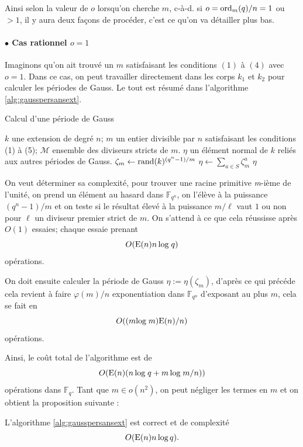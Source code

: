 \documentclass[a4paper]{article} %
\numberwithin{section}{part}
\numberwithin{equation}{section}
\newcommand\nroot[1]{\textit{#1}-ième}
\newcommand\GF[1]{\mathbb{F}_{#1}}
\newcommand\E[1]{\textup{E}(#1)}
\newcommand\ord[2]{\textup{ord}_{#1}(#2)}
\begin{document}
\vspace{0.3cm}
Ainsi selon la valeur de $o$ lorsqu'on cherche $m$, c-à-d. si $o = 
\ord{m}{q} /n = 1$ ou $> 1$, il y aura deux façons de procéder, c'est ce qu'on 
va détailler plus bas.
\paragraph{$\bullet$ Cas rationnel $o = 1$}
Imaginons qu'on ait trouvé un $m$ satisfaisant les conditions $(1)$ à $(4)$ avec
$o = 1$. Dans ce cas, on peut travailler directement dans les corps $k_1$ et 
$k_2$ pour calculer les périodes de Gauss. Le tout est résumé dans l'algorithme 
\ref{alg:gausspersansext}.

\begin{algorithm}
\caption{Calcul d'une période de Gauss}
\label{alg:gausspersansext}
\begin{algorithmic}[1]
\REQUIRE $k$ une extension de degré $n$; $m$ un entier divisible par $n$
satisfaisant les conditions (1) à (5); $\mathcal{M}$ ensemble des diviseurs
stricts de $m$.
\ENSURE $\eta$ un élément normal de $k$ reliés aux autres périodes de Gauss.
\bigskip
\REPEAT
    \STATE $\zeta_m \leftarrow \textup{rand}(k)^{(q^n - 1)/m}$
\STATE $\eta \leftarrow \sum_{a\in S}{\zeta_m^a}$
\RETURN $\eta$
\end{algorithmic}
\end{algorithm}
On veut déterminer sa complexité, pour trouver une racine primitive 
\nroot{m} de l'unité, on prend un élément au hasard dans $\GF{q^n}$, on l'élève 
à la puissance $(q^n - 1)/m$ et on teste si le résultat élevé à la puissance 
$m/\ell$ vaut $1$ ou non pour $\ell$ un diviseur premier strict de $m$. On 
s'attend à ce que cela réussisse après $O(1)$ essaies; chaque essaie prenant 
\begin{equation}
O(\E{n}n\,\textup{log\;}q)
\end{equation}
opérations.\par
On doit ensuite calculer la période de Gauss $\eta := \eta(\zeta_m)$,
d'après ce qui précéde cela revient à faire $\varphi(m)/n$ exponentiation dans
$\GF{q^n}$ d'exposant au plus $m$, cela se fait en 
\begin{equation}
O((m\textup{log\;}m)\E{n}/n) 
\end{equation}
opérations.\par
Ainsi, le coût total de l'algorithme est de 
\begin{equation}
O(\E{n}(n\,\textup{log\;}q + m\,\textup{log\;}m/n))
\end{equation}
opérations dans $\GF{q}$. Tant que $m\in o(n^2)$, on 
peut négliger les termes en $m$ et on obtient la proposition suivante :
\begin{prop}
\label{prop:algsansext}
L'algorithme \ref{alg:gausspersansext} est correct et de complexité
\begin{equation}
O(\E{n}n\,\textup{log\,}q).
\end{equation}
\end{prop}
\end{document}
